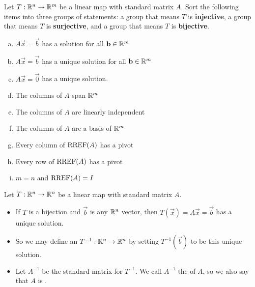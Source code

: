 \begin{activity}{15}
Let $T: \mathbb{R}^n \rightarrow \mathbb{R}^m$ be a linear map with standard matrix $A$.
Sort the following items into three groups of statements: a group that means
\(T\) is \textbf{injective}, a group that means \(T\) is \textbf{surjective},
and a group that means \(T\) is \textbf{bijective}.
\begin{multicols}{2}
\begin{enumerate}[(a)]
\item \(A\vec x=\vec b\) has a solution for all \(\mathbf b\in\mathbb{R}^m\)
\item \(A\vec x=\vec b\) has a unique solution for all \(\mathbf b\in\mathbb{R}^m\)
\item \(A\vec x=\vec 0\) has a unique solution.
\item The columns of $A$ span $\mathbb{R}^m$
\item The columns of $A$ are linearly independent
\item The columns of $A$ are a basis of $\mathbb{R}^m$
\item Every column of $\operatorname{RREF}(A)$ has a pivot
\item Every row of $\operatorname{RREF}(A)$ has a pivot
\item $m=n$ and $\operatorname{RREF}(A)=I$
\end{enumerate}
\end{multicols}
\end{activity}

\begin{definition}
  Let $T: \mathbb{R}^n \rightarrow \mathbb{R}^n$ be a linear map with standard matrix $A$.
\begin{itemize}
\item  If $T$ is a bijection and \(\vec b\) is any $\mathbb{R}^n$ vector, 
  then $T(\vec x)=A\vec x=\vec b$ has a unique solution.
\item So we may define an  $T^{-1} : \mathbb{R}^n \rightarrow \mathbb{R}^n$ 
  by setting $T^{-1}(\vec b)$ to be this unique solution.
\item Let $A^{-1}$ be the standard matrix for $T^{-1}$. We call $A^{-1}$ the
 of $A$, so we also say that $A$ is .
\end{itemize}
\end{definition}


